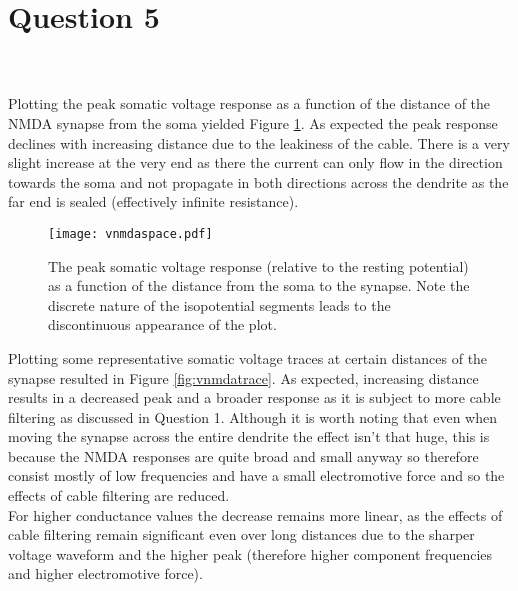 \documentclass[paper=a4, fontsize=11pt]{scrartcl} %
\numberwithin{equation}{section} %
\numberwithin{figure}{section} %
\numberwithin{table}{section} %
\begin{document}
\newpage
\section{\textbf{Question 5}}

\\
\\

Plotting the peak somatic voltage response as a function of the distance of the NMDA synapse from the soma yielded Figure \ref{fig:vnmdaspace}. As expected the peak response declines with increasing distance due to the leakiness of the cable. There is a very slight increase at the very end as there the current can only flow in the direction towards the soma and not propagate in both directions across the dendrite as the far end is sealed (effectively infinite resistance).\\


\begin{figure}[!h]
\centering
\texttt{[image: vnmdaspace.pdf]}
  \caption{The peak somatic voltage response (relative to the resting potential) as a function of the distance from the soma to the synapse. Note the discrete nature of the isopotential segments leads to the discontinuous appearance of the plot.}
  \label{fig:vnmdaspace}
\end{figure}

Plotting some representative somatic voltage traces at certain distances of the synapse resulted in Figure \ref{fig:vnmdatrace}. As expected, increasing distance results in a decreased peak and a broader response as it is subject to more cable filtering as discussed in Question 1. Although it is worth noting that even when moving the synapse across the entire dendrite the effect isn't that huge, this is because the NMDA responses are quite broad and small anyway so therefore consist mostly of low frequencies and have a small electromotive force and so the effects of cable filtering are reduced.\\

For higher conductance values the decrease remains more linear, as the effects of cable filtering remain significant even over long distances due to the sharper voltage waveform and the higher peak (therefore higher component frequencies and higher electromotive force).\\
\end{document}
